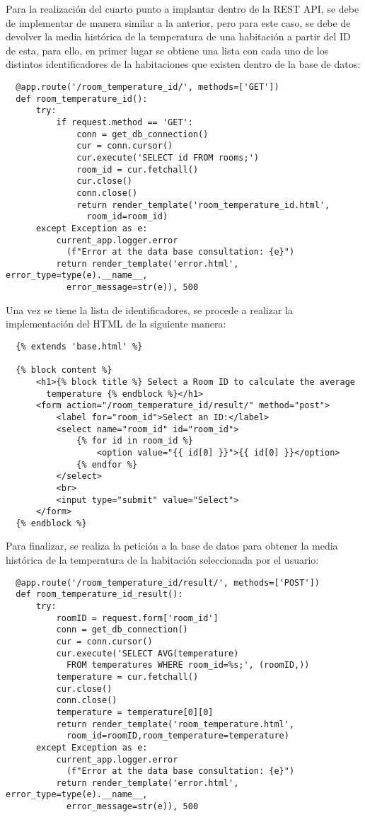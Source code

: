 \documentclass[11pt]{report}
\begin{document}
Para la realización del cuarto punto a implantar dentro de la REST API, se debe de implementar de manera similar a la anterior, pero para este caso, se debe de  devolver la media histórica de la temperatura de una habitación a partir del ID de esta, para ello, en primer lugar se obtiene una lista con cada uno de los distintos identificadores de la habitaciones que existen dentro de la base de datos:

\begin{verbatim}
  @app.route('/room_temperature_id/', methods=['GET'])
  def room_temperature_id():
      try:
          if request.method == 'GET':
              conn = get_db_connection()
              cur = conn.cursor()
              cur.execute('SELECT id FROM rooms;')
              room_id = cur.fetchall()
              cur.close()
              conn.close()
              return render_template('room_temperature_id.html', 
                room_id=room_id)
      except Exception as e:
          current_app.logger.error
            (f"Error at the data base consultation: {e}")
          return render_template('error.html', error_type=type(e).__name__, 
            error_message=str(e)), 500
\end{verbatim}

Una vez se tiene la lista de identificadores, se procede a realizar la implementación del HTML de la siguiente manera:

\begin{verbatim}
  {% extends 'base.html' %}

  {% block content %}
      <h1>{% block title %} Select a Room ID to calculate the average 
        temperature {% endblock %}</h1>
      <form action="/room_temperature_id/result/" method="post">
          <label for="room_id">Select an ID:</label>
          <select name="room_id" id="room_id">
              {% for id in room_id %}
                  <option value="{{ id[0] }}">{{ id[0] }}</option>
              {% endfor %}
          </select>
          <br>
          <input type="submit" value="Select">
      </form>
  {% endblock %}
\end{verbatim}

Para finalizar, se realiza la petición a la base de datos para obtener la media histórica de la temperatura de la habitación seleccionada por el usuario:

\begin{verbatim}
  @app.route('/room_temperature_id/result/', methods=['POST'])
  def room_temperature_id_result():
      try:
          roomID = request.form['room_id']
          conn = get_db_connection()
          cur = conn.cursor()
          cur.execute('SELECT AVG(temperature) 
            FROM temperatures WHERE room_id=%s;', (roomID,))
          temperature = cur.fetchall()
          cur.close()
          conn.close()
          temperature = temperature[0][0]
          return render_template('room_temperature.html', 
            room_id=roomID,room_temperature=temperature)
      except Exception as e:
          current_app.logger.error
            (f"Error at the data base consultation: {e}")
          return render_template('error.html', error_type=type(e).__name__, 
            error_message=str(e)), 500
\end{verbatim}
\end{document}
